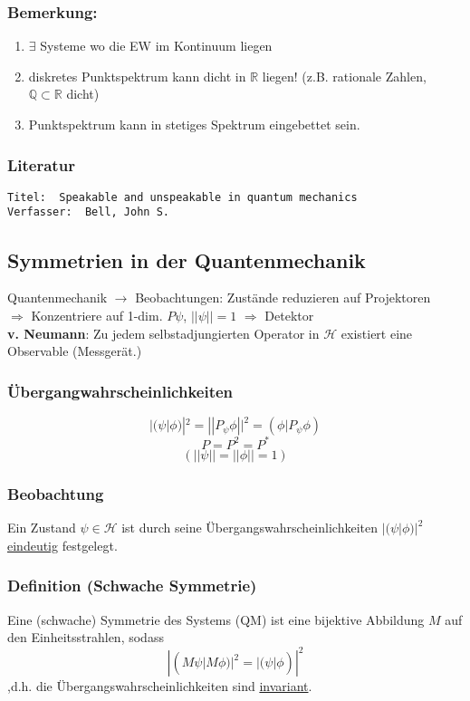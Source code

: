 \documentclass[twoside,a4paper]{scrartcl}
\newcommand{\R}{\mathbb{R}}
\renewcommand{\1}{\mathds{1}}
\newcommand{\Ra}{\Rightarrow}
\newcommand{\ra}{\rightarrow}
\renewcommand{\H}{\mathcal{H}}
\renewcommand{\R}{\mathbb{R}}
\begin{document}
\subsubsection*{Bemerkung:}
\begin{enumerate}
\item $\exists$ Systeme wo die EW im Kontinuum liegen
\item diskretes Punktspektrum kann dicht in $\R$ liegen! (z.B. rationale Zahlen, $\mathbb{Q} \subset \R$ dicht)
\item Punktspektrum kann in stetiges Spektrum eingebettet sein.
\end{enumerate}
\subsubsection*{Literatur}
\begin{tiny}
\begin{verbatim}
Titel:	Speakable and unspeakable in quantum mechanics
Verfasser:	Bell, John S. 
\end{verbatim}
\end{tiny}

\subsection{Symmetrien in der Quantenmechanik}
Quantenmechanik $\ra$ Beobachtungen: Zustände reduzieren auf Projektoren\\
$\Ra$ Konzentriere auf 1-dim. $P\psi$, $||\psi||=1$ $\Ra$ Detektor\\
\textbf{v. Neumann}: Zu jedem selbstadjungierten Operator in $\H$ existiert eine Observable (Messgerät.)\\
\subsubsection*{Übergangwahrscheinlichkeiten}
$$|(\psi|\phi)|^2=||P_\psi \phi||^2=(\phi|P_\psi\phi)$$
$$P=P^2=P^*$$
$$(||\psi||=||\phi||=1)$$
\subsubsection*{Beobachtung}
Ein Zustand $\psi \in \H$ ist durch seine Übergangswahrscheinlichkeiten $|(\psi|\phi)|^2$ \underline{eindeutig} festgelegt.
\subsubsection*{Definition (Schwache Symmetrie)}
Eine (schwache) Symmetrie des Systems (QM) ist eine bijektive Abbildung $M$ auf den Einheitsstrahlen, sodass
$$|(M\psi|M\phi)|^2=|(\psi|\phi)|^2$$
,d.h. die Übergangswahrscheinlichkeiten sind \underline{invariant}.
\end{document}
